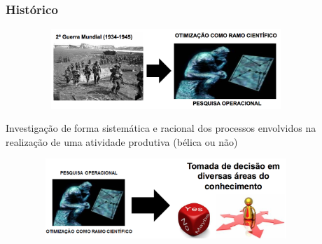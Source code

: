 \documentclass{beamer}
\begin{document}
\begin{frame}
	\frametitle{Histórico}
	\centering
	{
	\begin{figure}
		\includegraphics[width=10cm,height=3cm]{seg_guerra.png}
	\end{figure}
	Investigação de forma sistemática e racional dos processos envolvidos na realização de uma atividade produtiva (bélica ou não)
	}
	{
	\begin{figure}
		\includegraphics[width=10cm,height=3cm]{ciencia.png}
	\end{figure}
	}
\end{frame}
\end{document}
